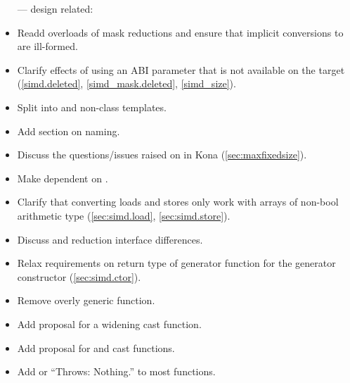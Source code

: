 \begin{itemize}
  \item[---] design related:
  \item Readd \bool overloads of mask reductions and ensure that implicit conversions to \bool are ill-formed.
  \item Clarify effects of using an ABI parameter that is not available on the target (\ref{simd.deleted}, \ref{simd_mask.deleted}, \ref{simd_size}).
  \item Split \whereexpression into \const and non-\const class templates.
  \item Add section on naming.
  \item Discuss the questions/issues raised on  in Kona (\autoref{sec:maxfixedsize}).
  \item Make  dependent on .
  \item Clarify that converting loads and stores only work with arrays of non-bool arithmetic type (\ref{sec:simd.load}, \ref{sec:simd.store}).
  \item Discuss \mask and  reduction interface differences.
  \item Relax requirements on return type of generator function for the generator constructor (\ref{sec:simd.ctor}).
  \item Remove overly generic  function.
  \item Add proposal for a widening cast function.
  \item Add proposal for  and  cast functions.
  \item Add  or “Throws: Nothing.” to most functions.


\end{itemize}

